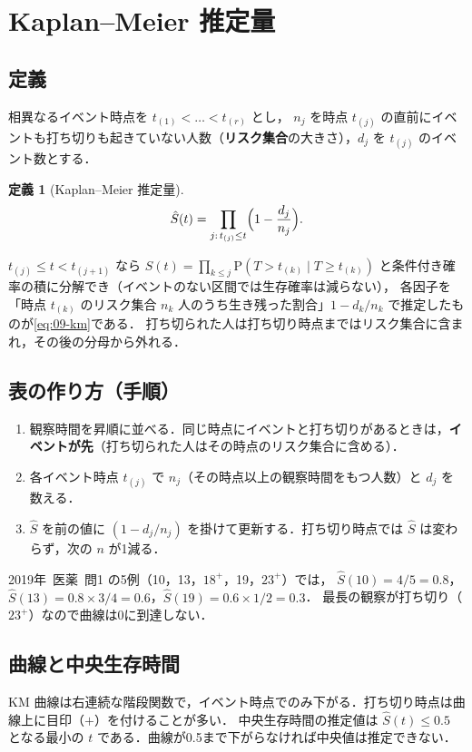 \documentclass[a4paper,11pt,openany]{ltjsbook}
\newtheorem{teigi}{定義}[chapter]
\newcommand{\tagbox}[2]{\tcbox[on line,boxsep=0.5pt,left=2pt,right=2pt,top=0.5pt,bottom=0.5pt,
  colframe=#1,colback=#1!10,boxrule=0.4pt,arc=1pt]{\scriptsize\bfseries\textcolor{#1}{#2}}}
\newcommand{\Hissu}{\tagbox{bkred}{必須}}
\newcommand{\Hinshutsu}{\tagbox{bkorange}{頻出}}
\newcommand{\kakomon}[2]{\mbox{#1年 医薬 問#2}}
\newcommand{\Prob}{\mathrm{P}}
\newcommand{\emphx}[1]{\textbf{\textcolor{bkblue}{#1}}}
\begin{document}
\section{Kaplan--Meier 推定量}\label{sec:09-km}
\Hissu\Hinshutsu
\subsection{定義}
相異なるイベント時点を $t_{(1)}<\dots<t_{(r)}$ とし，
$n_j$ を時点 $t_{(j)}$ の直前にイベントも打ち切りも起きていない人数（\emphx{リスク集合}の大きさ），$d_j$ を $t_{(j)}$ のイベント数とする．
\begin{teigi}[Kaplan--Meier 推定量]\label{def:09-km}
\begin{equation}
\hat S(t)=\prod_{j:\,t_{(j)}\le t}\Bigl(1-\frac{d_j}{n_j}\Bigr).\label{eq:09-km}
\end{equation}
\end{teigi}
$t_{(j)}\le t<t_{(j+1)}$ なら $S(t)=\prod_{k\le j}\Prob(T>t_{(k)}\mid T\ge t_{(k)})$ と条件付き確率の積に分解でき（イベントのない区間では生存確率は減らない），
各因子を「時点 $t_{(k)}$ のリスク集合 $n_k$ 人のうち生き残った割合」$1-d_k/n_k$ で推定したものが\cref{eq:09-km}である．
打ち切られた人は打ち切り時点まではリスク集合に含まれ，その後の分母から外れる．

\subsection{表の作り方（手順）}
\begin{enumerate}
\item 観察時間を昇順に並べる．同じ時点にイベントと打ち切りがあるときは，\textbf{イベントが先}（打ち切られた人はその時点のリスク集合に含める）．
\item 各イベント時点 $t_{(j)}$ で $n_j$（その時点以上の観察時間をもつ人数）と $d_j$ を数える．
\item $\hat S$ を前の値に $(1-d_j/n_j)$ を掛けて更新する．打ち切り時点では $\hat S$ は変わらず，次の $n$ が1減る．
\end{enumerate}
\kakomon{2019}{1} の5例（10，13，$18^+$，19，$23^+$）では，
$\hat S(10)=4/5=0.8$，$\hat S(13)=0.8\times3/4=0.6$，$\hat S(19)=0.6\times1/2=0.3$．
最長の観察が打ち切り（$23^+$）なので曲線は0に到達しない．

\subsection{曲線と中央生存時間}
KM 曲線は右連続な階段関数で，イベント時点でのみ下がる．打ち切り時点は曲線上に目印（$+$）を付けることが多い．
中央生存時間の推定値は $\hat S(t)\le0.5$ となる最小の $t$ である．曲線が0.5まで下がらなければ中央値は推定できない．
\end{document}
